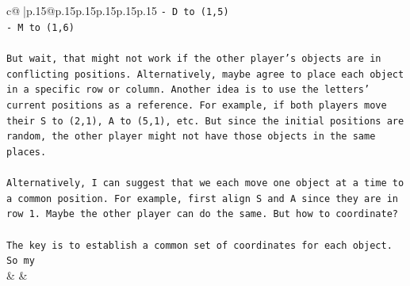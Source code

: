 \documentclass{article}
\begin{document}
{\begin{supertabular}{c@{$\;$}|p{.15\linewidth}@{}p{.15\linewidth}p{.15\linewidth}p{.15\linewidth}p{.15\linewidth}p{.15\linewidth}}
{{{\texttt{{-} D to (1,5)} \\
\texttt{{-} M to (1,6)} \\
\\ 
\texttt{But wait, that might not work if the other player's objects are in conflicting positions. Alternatively, maybe agree to place each object in a specific row or column. Another idea is to use the letters' current positions as a reference. For example, if both players move their S to (2,1), A to (5,1), etc. But since the initial positions are random, the other player might not have those objects in the same places.} \\
\\ 
\texttt{Alternatively, I can suggest that we each move one object at a time to a common position. For example, first align S and A since they are in row 1. Maybe the other player can do the same. But how to coordinate?} \\
\\ 
\texttt{The key is to establish a common set of coordinates for each object. So my} \\
            }
        }
    }
    & & \\ \\


\end{supertabular}}
\end{document}
